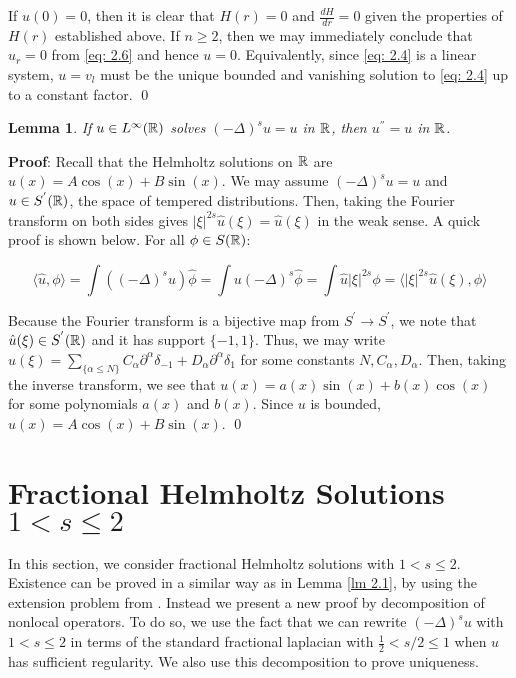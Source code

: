\documentclass{article}
\newtheorem{lemma}[theorem]{Lemma}
\begin{document}
If $u(0)=0$, then it is clear that $H(r)=0$ and $\frac{dH}{dr}=0$ given the properties of $H(r)$ established above. If $n \ge 2$, then we may immediately conclude that $u_r=0$ from \eqref{eq: 2.6} and hence $u=0$. Equivalently, since \eqref{eq: 2.4} is a linear system, $u=v_l$ must be the unique bounded and vanishing solution to \eqref{eq: 2.4} up to a constant factor.
\qed


\begin{lemma}
\label{lm 2.3}
    If $u \in L^\infty(\mathbb{R})$ solves $(-\Delta)^s u = u $ in $\mathbb{R}$, then $u^{''} = u $ in $\mathbb{R}$.
\end{lemma}





\noindent
\textbf{Proof}: Recall that the Helmholtz solutions on $\mathbb{R}$ are $u(x) = A\cos(x) + B\sin(x)$. We may assume $(-\Delta)^s u = u$ and $u \in S^{'}(\mathbb{R})$, the space of tempered distributions. Then, taking the Fourier transform on both sides gives $|\xi|^{2s}\hat{u}(\xi) = \hat{u}(\xi)$ in the weak sense. A quick proof is shown below. For all $\phi \in S(\mathbb{R})$:

\begin{equation}
    \langle \hat{u}, \phi \rangle = \int{((-\Delta)^s u) \hat{\phi}} = \int{u (-\Delta)^s \hat{\phi}} = \int{\hat{u} |\xi|^{2s}\phi} =\langle |\xi|^{2s}\hat{u}(\xi), \phi \rangle
    \tag{2.7} \label{eq: 2.7}
\end{equation}          


Because the Fourier transform is a bijective map from $S^{'} \to S^{'}$, we note that $\hat{u}(\xi) \in S^{'}(\mathbb{R})$ and it has support $\{-1, 1\}$. Thus, we may write $\hat{u}(\xi)= \sum_{\{\alpha \le N\}}C_\alpha \partial^\alpha \delta_{-1} + D_\alpha \partial^\alpha \delta_{1}$ for some constants $N, C_{\alpha}, D_\alpha$. Then, taking the inverse transform, we see that $u(x) = a(x)\sin(x) + b(x)\cos(x)$ for some polynomials $a(x)$ and $b(x)$.  Since $u$ is bounded,  $u(x)=A\cos(x)+B\sin(x)$. \qed


\section{Fractional Helmholtz Solutions $1<s\le2$}

\indent


In this section, we consider fractional Helmholtz solutions with $ 1<s\le2$. Existence can be proved in a similar way as in Lemma \ref{lm 2.1}, by using  the extension problem from \cite{Yang}. Instead we present a new proof by decomposition of nonlocal operators.  To do so, we use the fact that we can rewrite $(-\Delta)^s u$ with $1<s\le2$ in terms of the standard fractional laplacian with $\frac{1}{2}<s/2\le1$ when $u$ has sufficient regularity. We also use this decomposition to prove uniqueness.\\
\end{document}
